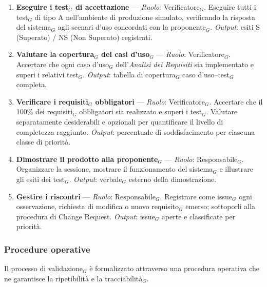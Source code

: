 \documentclass[a4paper, 10pt]{article}
\begin{document}
\begin{enumerate}
    \item \textbf{Eseguire i test$_G$ di accettazione} --- \textit{Ruolo}: Verificatore$_G$. Eseguire tutti i test$_G$ di tipo A nell'ambiente di produzione simulato, verificando la risposta del sistema$_G$ agli scenari d'uso concordati con la proponente$_G$.
    \textit{Output}: esiti S (Superato) / NS (Non Superato) registrati.

    \item \textbf{Valutare la copertura$_G$ dei casi d'uso$_G$} --- \textit{Ruolo}: Verificatore$_G$. Accertare che ogni caso d'uso$_G$ dell'\emph{Analisi dei Requisiti} sia implementato e superi i relativi test$_G$.
    \textit{Output}: tabella di copertura$_G$ caso d'uso--test$_G$ completa.

    \item \textbf{Verificare i requisiti$_G$ obbligatori} --- \textit{Ruolo}: Verificatore$_G$. Accertare che il 100\% dei requisiti$_G$ obbligatori sia realizzato e superi i test$_G$. Valutare separatamente desiderabili e opzionali per quantificare il livello di completezza raggiunto.
    \textit{Output}: percentuale di soddisfacimento per ciascuna classe di priorità.

    \item \textbf{Dimostrare il prodotto alla proponente$_G$} --- \textit{Ruolo}: Responsabile$_G$. Organizzare la sessione, mostrare il funzionamento del sistema$_G$ e illustrare gli esiti dei test$_G$.
    \textit{Output}: verbale$_G$ esterno della dimostrazione.

    \item \textbf{Gestire i riscontri} --- \textit{Ruolo}: Responsabile$_G$. Registrare come issue$_G$ ogni osservazione, richiesta di modifica o nuovo requisito$_G$ emerso; sottoporli alla procedura di Change Request.
    \textit{Output}: issue$_G$ aperte e classificate per priorità.
\end{enumerate}

\subsubsection{Procedure operative}
\label{subsec:procedure_validazione}

Il processo di validazione$_G$ è formalizzato attraverso una procedura operativa che ne garantisce la ripetibilità e la tracciabilità$_G$.
\end{document}
